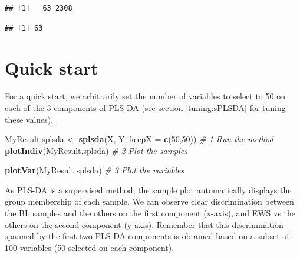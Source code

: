 \documentclass[]{book}
\newenvironment{Shaded}{\begin{snugshade}}{\end{snugshade}}
\newcommand{\CommentTok}[1]{\textcolor[rgb]{0.56,0.35,0.01}{\textit{#1}}}
\newcommand{\DataTypeTok}[1]{\textcolor[rgb]{0.13,0.29,0.53}{#1}}
\newcommand{\DecValTok}[1]{\textcolor[rgb]{0.00,0.00,0.81}{#1}}
\newcommand{\KeywordTok}[1]{\textcolor[rgb]{0.13,0.29,0.53}{\textbf{#1}}}
\newcommand{\NormalTok}[1]{#1}
\newcommand{\OperatorTok}[1]{\textcolor[rgb]{0.81,0.36,0.00}{\textbf{#1}}}
\newcommand{\StringTok}[1]{\textcolor[rgb]{0.31,0.60,0.02}{#1}}
\begin{document}
\begin{verbatim}
## [1]   63 2308
\end{verbatim}

\begin{verbatim}
## [1] 63
\end{verbatim}

\hypertarget{quick-start-1}{%
\section{Quick start}\label{quick-start-1}}

For a quick start, we arbitrarily set the number of variables to select to 50 on each of the 3 components of PLS-DA (see section \ref{tuning:sPLSDA} for tuning these values).

\begin{Shaded}
\begin{Highlighting}[]
\NormalTok{MyResult.splsda <-}\StringTok{ }\KeywordTok{splsda}\NormalTok{(X, Y, }\DataTypeTok{keepX =} \KeywordTok{c}\NormalTok{(}\DecValTok{50}\NormalTok{,}\DecValTok{50}\NormalTok{)) }\CommentTok{# 1 Run the method}
\KeywordTok{plotIndiv}\NormalTok{(MyResult.splsda)                          }\CommentTok{# 2 Plot the samples}
\end{Highlighting}
\end{Shaded}

\begin{Shaded}
\begin{Highlighting}[]
\KeywordTok{plotVar}\NormalTok{(MyResult.splsda)                            }\CommentTok{# 3 Plot the variables}
\end{Highlighting}
\end{Shaded}

\begin{Shaded}
\end{Shaded}

As PLS-DA is a supervised method, the sample plot automatically displays the group membership of each sample. We can observe clear discrimination between the BL samples and the others on the first component (x-axis), and EWS vs the others on the second component (y-axis). Remember that this discrimination spanned by the first two PLS-DA components is obtained based on a subset of 100 variables (50 selected on each component).
\end{document}
